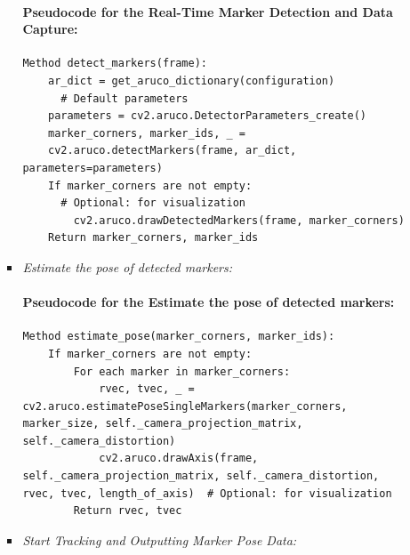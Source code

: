 \documentclass[12pt]{article}
\begin{document}
\begin{enumerate}
\begin{enumerate}
\begin{itemize}
                                    \paragraph{Pseudocode for the Real-Time Marker Detection and Data Capture:}
                                    \begin{verbatim}
Method detect_markers(frame):
    ar_dict = get_aruco_dictionary(configuration)
      # Default parameters
    parameters = cv2.aruco.DetectorParameters_create() 
    marker_corners, marker_ids, _ = 
    cv2.aruco.detectMarkers(frame, ar_dict, parameters=parameters)
    If marker_corners are not empty:
      # Optional: for visualization
        cv2.aruco.drawDetectedMarkers(frame, marker_corners)  
    Return marker_corners, marker_ids
                              \end{verbatim}
                              \item \textit{Estimate the pose of detected markers:}

                                    \paragraph{Pseudocode for the Estimate the pose of detected markers:}
                                    \begin{verbatim}
Method estimate_pose(marker_corners, marker_ids):
    If marker_corners are not empty:
        For each marker in marker_corners:
            rvec, tvec, _ = cv2.aruco.estimatePoseSingleMarkers(marker_corners, marker_size, self._camera_projection_matrix, self._camera_distortion)
            cv2.aruco.drawAxis(frame, self._camera_projection_matrix, self._camera_distortion, rvec, tvec, length_of_axis)  # Optional: for visualization
        Return rvec, tvec
                              \end{verbatim}
                              \item \textit{Start Tracking and Outputting Marker Pose Data:}


\end{itemize}
\end{enumerate}
\end{enumerate}
\end{document}
